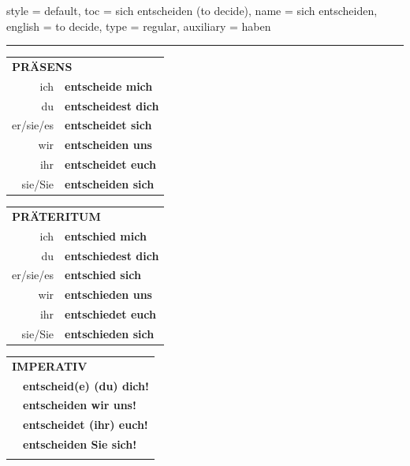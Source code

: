 \begin{verbentry}{
  style = {default},
  toc = {sich entscheiden (to decide)},
  name = {sich entscheiden},
  english = {to decide},
  type = {regular},
  auxiliary = {haben}
}
 
    
       \vspace{5pt}

    \hrule
    
    \vspace{5pt}

  \begin{tabular}{rl}
     \multicolumn{2}{l}{\textbf{PRÄSENS} }\\
    ich & \textbf{entscheide mich}\\
    du & \textbf{entscheidest dich}\\
    er/sie/es & \textbf{entscheidet sich}\\
    wir & \textbf{entscheiden uns}\\
    ihr & \textbf{entscheidet euch}\\
    sie/Sie & \textbf{entscheiden sich}\\
  \end{tabular}
  \hfill
     \begin{tabular}{rl}
    \multicolumn{2}{l}{\textbf{PRÄTERITUM} }\\
    ich & \textbf{entschied mich}\\
    du & \textbf{entschiedest dich}\\
    er/sie/es & \textbf{entschied sich}\\
    wir & \textbf{entschieden uns}\\
    ihr & \textbf{entschiedet euch}\\
    sie/Sie & \textbf{entschieden sich}\\
  \end{tabular}
  \hfill
  \begin{tabular}{rl}
     \multicolumn{2}{l}{\textbf{IMPERATIV} }\\
   & \textbf{entscheid(e) (du) dich!}\\
   & \textbf{entscheiden wir uns!}\\
   & \textbf{entscheidet (ihr) euch!}\\
   & \textbf{entscheiden Sie sich!}\\
   & \vspace{10pt}
  \end{tabular}

    \vspace{10pt}


\end{verbentry}
